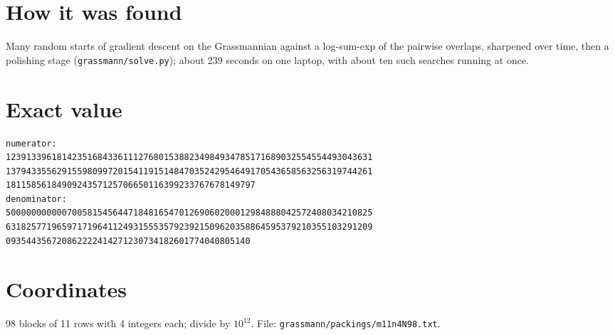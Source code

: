 \documentclass[11pt,a4paper]{article}
\begin{document}
\section{How it was found}
Many random starts of gradient descent on the Grassmannian against a log-sum-exp of the pairwise overlaps, sharpened over time, then a polishing stage (\texttt{grassmann/solve.py}); about 239 seconds on one laptop, with about ten such searches running at once.


\appendix
\section{Exact value}
{\small
\begin{verbatim}
numerator:
123913396181423516843361112768015388234984934785171689032554554493043631
137943355629155980997201541191514847035242954649170543658563256319744261
1811585618490924357125706650116399233767678149797
denominator:
500000000000700581545644718481654701269060200012984888042572408034210825
631825771965971719641124931555357923921509620358864595379210355103291209
093544356720862222414271230734182601774040805140
\end{verbatim}}

\section{Coordinates}
98 blocks of 11 rows with 4 integers each; divide by $10^{12}$. File: \texttt{grassmann/packings/m11n4N98.txt}.
{\tiny
\begin{multicols}{3}
\end{multicols}}
\end{document}

